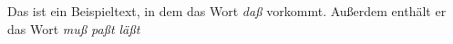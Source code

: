 \documentclass{article}
\begin{document}
Das ist ein Beispieltext, in dem das Wort \textit{daß} vorkommt.
Außerdem enthält er das Wort \textit{muß}
\textit{paßt}
\textit{läßt}
\end{document}
